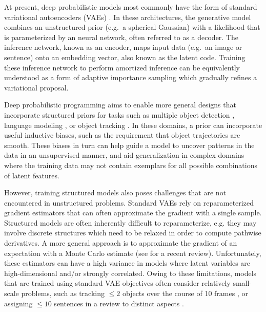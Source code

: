 \documentclass{article}
\theoremstyle{definition}
\begin{document}
At present, deep probabilistic models most commonly have the form of standard variational autoencoders (VAEs) \cite{kingma2013auto-encoding, rezende2014stochastic}. In these architectures, the  generative model combines an unstructured prior (e.g.~a spherical Gaussian) with a likelihood that is parameterized by an neural network, often referred to as a decoder. The inference network, known as an encoder, maps input data (e.g.~an image or sentence) onto an embedding vector, also known as the latent code.
Training these inference network to perform amortized inference can be equivalently understood as a form of adaptive importance sampling which gradually refines a variational proposal.

Deep probabilistic programming aims to enable more general designs that incorporate structured priors for tasks such as multiple object detection \cite{eslami2016attend}, language modeling \cite{esmaeili2019structured}, or object tracking \cite{kosiorek2018sequential}. In these domains, a prior can incorporate useful inductive biases, such as the requirement that object trajectories are smooth. These biases in turn can help guide a model to uncover patterns in the data in an unsupervised manner, and aid generalization in complex domains where the training data may not contain exemplars for all possible combinations of latent features.

However, training structured models also poses challenges that are not encountered in unstructured problems. Standard VAEs rely on reparameterized gradient estimators that can often approximate the gradient with a single sample. Structured models are often inherently difficult to reparameterize, e.g. they may involve discrete structures which need to be relaxed in order to compute pathwise derivatives. A more general approach is to approximate the gradient of an expectation with a Monte Carlo estimate (see \cite{mohamed2019monte} for a recent review). 
Unfortunately, these estimators can have a high variance in models where latent variables are high-dimensional and/or strongly correlated. Owing to these limitations, models that are trained using standard VAE objectives often consider relatively small-scale problems, such as tracking $\le 2$ objects over the course of 10 frames \cite{kosiorek2018sequential}, or assigning $\le 10$ sentences in a review to distinct aspects \cite{esmaeili2019structured}. 

\end{document}
